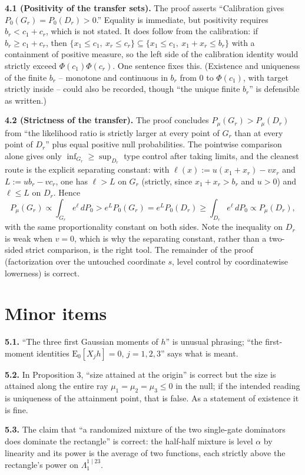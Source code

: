 \documentclass[12pt]{article}
\newcommand{\E}{\mathrm{E}}
\begin{document}
\textbf{4.1 (Positivity of the transfer sets).} The proof asserts
``Calibration gives $P_0(G_r)=P_0(D_r)>0$.'' Equality is immediate, but
positivity requires $b_r<c_1+c_r$, which is not stated. It does follow
from the calibration: if $b_r\ge c_1+c_r$, then
$\{x_1\le c_1,\ x_r\le c_r\}\subseteq\{x_1\le c_1,\ x_1+x_r\le b_r\}$
with a containment of positive measure, so the left side of the
calibration identity would strictly exceed $\Phi(c_1)\Phi(c_r)$. One
sentence fixes this. (Existence and uniqueness of the finite $b_r$ --
monotone and continuous in $b_r$ from $0$ to $\Phi(c_1)$, with target
strictly inside -- could also be recorded, though ``the unique finite
$b_r$'' is defensible as written.)

\textbf{4.2 (Strictness of the transfer).} The proof concludes
$P_\mu(G_r)>P_\mu(D_r)$ from ``the likelihood ratio is strictly larger
at every point of $G_r$ than at every point of $D_r$'' plus equal
positive null probabilities. The pointwise comparison alone gives only
$\inf_{G_r}\ge\sup_{D_r}$ type control after taking limits, and the
cleanest route is the explicit separating constant: with
$\ell(x):=u(x_1+x_r)-vx_r$ and $L:=ub_r-vc_r$, one has $\ell>L$ on
$G_r$ (strictly, since $x_1+x_r>b_r$ and $u>0$) and $\ell\le L$ on
$D_r$. Hence
\[
P_\mu(G_r)\propto\int_{G_r}e^{\ell}\,dP_0>e^{L}P_0(G_r)
=e^{L}P_0(D_r)\ge\int_{D_r}e^{\ell}\,dP_0\propto P_\mu(D_r),
\]
with the same proportionality constant on both sides. Note the
inequality on $D_r$ is weak when $v=0$, which is why the separating
constant, rather than a two-sided strict comparison, is the right tool.
The remainder of the proof (factorization over the untouched coordinate
$s$, level control by coordinatewise lowerness) is correct.

\section{Minor items}

\textbf{5.1.} ``The three first Gaussian moments of $h$'' is unusual
phrasing; ``the first-moment identities $\E_0[X_jh]=0$, $j=1,2,3$''
says what is meant.

\textbf{5.2.} In Proposition 3, ``size attained at the origin'' is
correct but the size is attained along the entire ray
$\mu_1=\mu_2=\mu_3\le0$ in the null; if the intended reading is
uniqueness of the attainment point, that is false. As a statement of
existence it is fine.

\textbf{5.3.} The claim that ``a randomized mixture of the two
single-gate dominators does dominate the rectangle'' is correct: the
half-half mixture is level $\alpha$ by linearity and its power is the
average of two functions, each strictly above the rectangle's power on
$\Lambda_1^{1\mid23}$.
\end{document}
